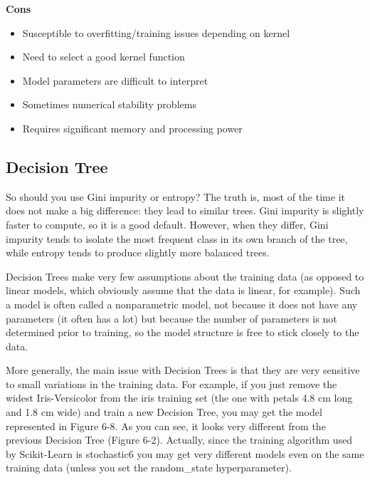 \documentclass[]{book}
\begin{document}
\textbf{Cons}

\begin{itemize}
\item
  Susceptible to overfitting/training issues depending on kernel
\item
  Need to select a good kernel function
\item
  Model parameters are difficult to interpret
\item
  Sometimes numerical stability problems
\item
  Requires significant memory and processing power
\end{itemize}

\hypertarget{decision-tree}{%
\subsection{Decision Tree}\label{decision-tree}}

So should you use Gini impurity or entropy? The truth is, most of the time it does not make a big difference: they lead to similar trees. Gini impurity is slightly faster to compute, so it is a good default. However, when they differ, Gini impurity tends to isolate the most frequent class in its own branch of the tree, while entropy tends to produce slightly more balanced trees.

Decision Trees make very few assumptions about the training data (as opposed to linear models, which obviously assume that the data is linear, for example). Such a model is often called a nonparametric model, not because it does not have any parameters (it often has a lot) but because the number of parameters is not determined prior to training, so the model structure is free to stick closely to the data.

More generally, the main issue with Decision Trees is that they are very sensitive to small variations in the training data. For example, if you just remove the widest Iris-Versicolor from the iris training set (the one with petals 4.8 cm long and 1.8 cm wide) and train a new Decision Tree, you may get the model represented in Figure 6-8. As you can see, it looks very different from the previous Decision Tree (Figure 6-2). Actually, since the training algorithm used by Scikit-Learn is stochastic6 you may get very different models even on the same training data (unless you set the random\_state hyperparameter).
\end{document}
